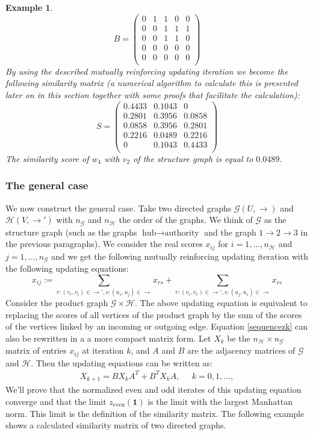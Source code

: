 \documentclass[a4paper,11pt]{report}
\newtheorem{example}[theorem]{Example}
\newcommand{\graf}{\mathscr{G}}
\newcommand{\grafeen}{\mathscr{H}}
\begin{document}
\begin{example}
$$B = \begin{pmatrix}
0 & 1 & 1 & 0 & 0\\
0 & 0 & 1 & 1 & 1\\
0 & 0 & 1 & 1 & 0\\
0 & 0 & 0 & 0 & 0\\
0 & 0 & 0 & 0 & 0\\
\end{pmatrix}$$
 By using the described mutually reinforcing updating iteration we become the 
 following similarity matrix (a numerical algorithm to calculate this is presented later 
 on in this section together with some proofs that facilitate the calculation):
 $$ S = \begin{pmatrix}
0.4433 & 0.1043 & 0 \\
0.2801 & 0.3956 & 0.0858 \\
0.0858 & 0.3956 & 0.2801\\
0.2216 & 0.0489 & 0.2216\\
0 & 0.1043 & 0.4433 \\
\end{pmatrix}$$
The similarity score of $w_4$ with $v_2$ of the structure graph is equal to 
$0.0489$.
 \end{example}

 \subsubsection{The general case}
 We now construct the general case. Take two directed graphs $\graf(U, \to)$ and $\grafeen(V, \to')$ 
 with $n_\graf$ and $n_\grafeen$ the order of the graphs. We think of $\graf$ as the structure 
 graph (such as the graphs $\text{hub}\to \text{authority}$ and the graph $1\to 2\to 
 3$ in the previous paragraphs). We consider the real scores $x_{ij}$ for $i = 1,\ldots,n_\grafeen$ and $j = 1,\ldots,n_\graf$ and we
 get the following mutually reinforcing updating iteration with the following updating equations:
 $$x_{ij} := \sum_{r:(v_r,v_i)\in \to', s:(u_s,u_j) \in \to} x_{rs} +  \sum_{r:(v_i,v_r)\in \to', s:(u_j,u_s) \in \to} x_{rs} $$
 Consider the product graph $\graf \times \grafeen.$ The above updating equation is equivalent to replacing
 the scores of all vertices of the product graph by the sum of the scores of the vertices linked by an incoming
 or outgoing edge. Equation \ref{sequencezk} can also be rewritten in a a more compact matrix form. Let $X_k$
 be the $n_\grafeen \times n_\graf$ matrix of entries $x_{ij}$ at iteration $k$, and $A$ and $B$ are the adjacency matrices
 of $\graf$ and $\grafeen$. Then the 
 updating equations can be written as:
 \begin{eqnarray}
X_{k+1} = BX_kA^T + B^TX_kA,\;\;\;\;\; k=0,1,\ldots,
  \end{eqnarray}
We'll prove that the normalized even and odd iterates of 
 this updating equation converge and that the limit $z_{\text{even}}(\mathbf{1})$ 
 is the limit with the largest Manhattan norm. This limit is the definition of 
 the similarity matrix. The following example shows a calculated similarity 
 matrix of two directed graphs.
 
\end{document}
